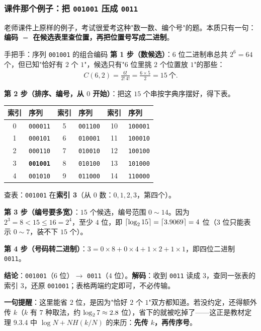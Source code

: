 \subsubsection{课件那个例子：把 \texttt{001001} 压成 \texttt{0011}}

老师课件上原样的例子，考试很爱考这种"数一数、编个号"的题。本质只有一句：\textbf{编码 $=$ 在候选表里查位置，再把位置号写成二进制}。

\begin{calc}{手把手：序列 \texttt{001001} 的组合编码}
\textbf{第 1 步（数候选）}：$6$ 位二进制串总共 $2^6=64$ 个，但已知"恰好有 $2$ 个 $1$"，候选只有"$6$ 位里挑 $2$ 个位置放 $1$"的那些：
\begin{align*}
C(6,2)=\frac{6!}{2!\,4!}=\frac{6\times5}{2}=15\ \text{个}.
\end{align*}

\textbf{第 2 步（排序、编号，从 $0$ 开始）}：把这 $15$ 个串按字典序摆好，得下表。

\begin{center}\small
\begin{tabular}{clclcl}
\toprule
索引 & 序列 & 索引 & 序列 & 索引 & 序列 \\
\midrule
0 & \texttt{000011} & 5 & \texttt{001100} & 10 & \texttt{100001} \\
1 & \texttt{000101} & 6 & \texttt{010001} & 11 & \texttt{100010} \\
2 & \texttt{000110} & 7 & \texttt{010010} & 12 & \texttt{100100} \\
3 & \texttt{\textbf{001001}} & 8 & \texttt{010100} & 13 & \texttt{101000} \\
4 & \texttt{001010} & 9 & \texttt{011000} & 14 & \texttt{110000} \\
\bottomrule
\end{tabular}
\end{center}

查表：\texttt{001001} 在\textbf{索引 3}（从 $0$ 数：$0,1,2,3$，第四个）。

\textbf{第 3 步（编号要多宽）}：$15$ 个候选，编号范围 $0\sim14$。因为 $2^3=8<15\le16=2^4$，至少 $4$ 位，即 $\lceil\log_{2} 15\rceil=\lceil3.9069\rceil=4$ 位（$3$ 位只能表示 $0\sim7$，装不下 $15$ 个）。

\textbf{第 4 步（号码转二进制）}：$3=0\times8+0\times4+1\times2+1\times1$，即四位二进制 \texttt{0011}。

\textbf{结论}：\texttt{001001}（$6$ 位）$\to$ \texttt{0011}（$4$ 位）。\textbf{解码}：收到 \texttt{0011} 读成 $3$，查同一张表的索引 $3$，还原 \texttt{001001}；表格两端约定即可，不必传输。

\textbf{一句提醒}：这里能省 \(2\) 位，是因为"恰好 $2$ 个 $1$"双方都知道。若没约定，还得额外传 $k$（$k$ 有 $7$ 种取法，约 $\log_{2} 7\approx2.8$ 位），省下的就被吃掉了——这正是教材定理 9.3.4 中 $\log N+NH(k/N)$ 的来历：\textbf{先传 $k$，再传序号}。
\end{calc}

